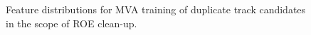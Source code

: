 \documentclass[headings=standardclasses,headings=big,oneside,a4paper,openany,12pt]{scrbook}
\begin{document}
\begin{figure}[H]
\caption{Feature distributions for MVA training of duplicate track candidates in the scope of ROE clean-up.}
\end{figure}
\end{document}
